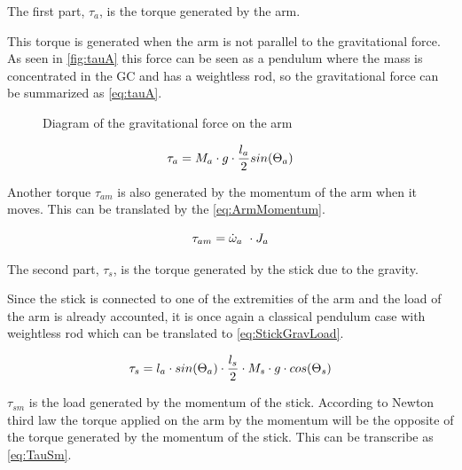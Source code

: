 The first part, $\tau_a$, is the torque generated by the arm.

 This torque is generated when the arm is not parallel to the gravitational force. As seen in \autoref{fig:tauA} this force can be seen as a pendulum where the mass is concentrated in the GC and has a weightless rod, so the gravitational force can be summarized as \autoref{eq:tauA}.

\begin{figure}[htbp]
	\caption{Diagram of the gravitational force on the arm}\label{fig:tauA}
\end{figure}

\begin{equation}\label{eq:tauA}
	\tau_a=M_a\cdot g \cdot \frac{l_a}{2} sin(\Theta_a) \addunit{\newton\meter}
\end{equation}
\startexplain
{}
\stopexplain

Another torque $\tau_{am}$ is also generated by the momentum of the arm when it moves. This can be translated by the \autoref{eq:ArmMomentum}.

\begin{equation}\label{eq:ArmMomentum}
	\tau_{am}=\dot\omega_a\ \cdot J_a \addunit{\newton\meter}
\end{equation}
\startexplain
{}
\stopexplain

The second part, $\tau_s$, is the torque generated by the stick due to the gravity.

Since the stick is connected to one of the extremities of the arm and the load of the arm is already accounted, it is once again a classical pendulum case with weightless rod which can be translated to \autoref{eq:StickGravLoad}.

\begin{equation}\label{eq:StickGravLoad}
	\tau_s = l_a\cdot sin(\Theta_a) \cdot \frac{l_s}{2}\cdot M_s\cdot g\cdot cos(\Theta_s) \addunit{\newton\meter}
\end{equation}

$\tau_{sm}$ is the load generated by the momentum of the stick. According to Newton third law the torque applied on the arm by the momentum will be the opposite of the torque generated by the momentum of the stick. This can be transcribe as \autoref{eq:TauSm}.

